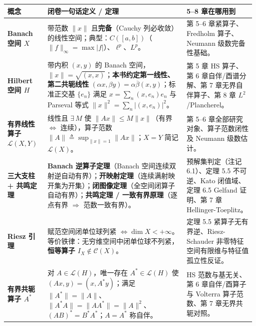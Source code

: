 \documentclass[11pt,a4paper]{article}
\newcounter{none}
\begin{document}
{\def\LTcaptype{none} %
{\small\renewcommand{\arraystretch}{1.38}\setlength{\tabcolsep}{5pt}
\begin{longtable}[]{@{}
  >{\raggedright\arraybackslash}p{}
  >{\raggedright\arraybackslash}p{}
  >{\raggedright\arraybackslash}p{}@{}}
\toprule\noalign{}
\rowcolor{AccentSoft}
\begin{minipage}[b]{\linewidth}\raggedright
概念
\end{minipage} & \begin{minipage}[b]{\linewidth}\raggedright
闭卷一句话定义 / 定理
\end{minipage} & \begin{minipage}[b]{\linewidth}\raggedright
5--8 章在哪用到
\end{minipage} \\
\midrule\noalign{}
\endhead
\bottomrule\noalign{}
\endlastfoot
\textbf{Banach 空间 \(X\)} & 带范数 \(\lVert x\rVert\) 且\textbf{完备}（Cauchy 列必收敛）的线性空间；典型：\(C([a,b])\)（\(\lVert f\rVert_\infty=\max\lvert f\rvert\)）、\(\ell^p\)、\(L^p\)。 & 第 5--6 章紧算子、Fredholm 算子、Neumann 级数完备性基础。 \\
\textbf{Hilbert 空间 \(H\)} & 带内积 \((x,y)\) 的 Banach 空间，\(\lVert x\rVert=\sqrt{(x,x)}\)；\textbf{本书约定第一线性、第二共轭线性} \((\alpha x,\beta y)=\alpha\overline{\beta}(x,y)\)；标准正交基 \(\{e_n\}\) 满足 \(x=\sum_n(x,e_n)e_n\) 与 Parseval 等式 \(\lVert x\rVert^2=\sum_n\lvert(x,e_n)\rvert^2\)。 & 第 5 章 HS 算子、第 6 章自伴/酉谱分解、第 7 章无界自伴算子、第 8 章 \(L^2\)/Plancherel。 \\
\textbf{有界线性算子 \(\mathcal{L}(X,Y)\)} & 线性且 \(\exists\,M\) 使 \(\lVert Ax\rVert\le M\lVert x\rVert\)（有界 \(\iff\) 连续），算子范数 \(\lVert A\rVert\triangleq\sup_{\lVert x\rVert=1}\lVert Ax\rVert\)；\(X=Y\) 简记 \(\mathcal{L}(X)\)。 & 第 5--6 章全部研究对象、算子范数闭性及 Neumann 级数估计。 \\
\textbf{三大支柱 + 共鸣定理} & \textbf{Banach 逆算子定理}（Banach 空间连续双射逆自动有界）；\textbf{开映射定理}（连续满射映开集为开集）；\textbf{闭图像定理}（全空间闭算子自动有界）；\textbf{共鸣定理 / 一致有界原理}（逐点有界 \(\Rightarrow\) 范数一致有界）。 & 预解集判定（注记 6.1）、定理 5.5 不可逆、Kato 闭值域、定理 6.5 Gelfand 证明、第 7 章 Hellinger-Toeplitz。 \\
\textbf{Riesz 引理} & 赋范空间闭单位球列紧 \(\iff \dim X < +\infty\)。等价铁律：无穷维空间中闭单位球不列紧，\textbf{恒等算子 \(I_X \notin \mathcal{C}(X)\)}。 & 定理 5.5 紧算子无有界逆、Riesz-Schauder 非零特征空间有限维与特征值孤立性反证。 \\
\textbf{有界共轭算子 \(A^*\)} & 对 \(A\in\mathcal{L}(H)\)，唯一存在 \(A^*\in\mathcal{L}(H)\) 使 \((Ax,y)=(x,A^*y)\)；满足 \(\lVert A^*\rVert=\lVert A\rVert\)、\(\lVert A^*A\rVert=\lVert AA^*\rVert=\lVert A\rVert^2\)、\((AB)^*=B^*A^*\)；\(A=A^*\) 称自伴。 & HS 范数与基无关、第 6 章自伴/酉算子与 Volterra 算子范数、第 7 章无界共轭对照。 \\
\end{longtable}
}
}
\end{document}

